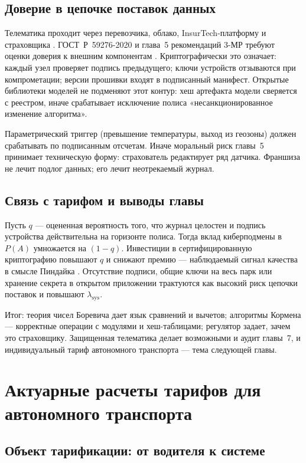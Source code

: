 \documentclass[a4paper,14pt]{extarticle}
\begin{document}
\subsection{Доверие в цепочке поставок данных}

Телематика проходит через перевозчика, облако, InsurTech-платформу и страховщика \cite{insurtech}. ГОСТ~Р~59276-2020 и глава~5 рекомендаций 3-МР требуют оценки доверия к внешним компонентам \cite{cbr}. Криптографически это означает: каждый узел проверяет подпись предыдущего; ключи устройств отзываются при компрометации; версии прошивки входят в подписанный манифест. Открытые библиотеки моделей не подменяют этот контур: хеш артефакта модели сверяется с реестром, иначе срабатывает исключение полиса «несанкционированное изменение алгоритма».

Параметрический триггер (превышение температуры, выход из геозоны) должен срабатывать по подписанным отсчетам. Иначе моральный риск главы~5 принимает техническую форму: страхователь редактирует ряд датчика. Франшиза не лечит подлог данных; его лечит неотрекаемый журнал.

\subsection{Связь с тарифом и выводы главы}

Пусть $q$ --- оцененная вероятность того, что журнал целостен и подпись устройства действительна на горизонте полиса. Тогда вклад киберподмены в $P(A)$ умножается на $(1-q)$. Инвестиции в сертифицированную криптографию повышают $q$ и снижают премию --- наблюдаемый сигнал качества в смысле Пиндайка \cite{pindyck}. Отсутствие подписи, общие ключи на весь парк или хранение секрета в открытом приложении трактуются как высокий риск цепочки поставок \cite{cbr} и повышают $\lambda_{\mathrm{sys}}$.

Итог: теория чисел Боревича дает язык сравнений и вычетов; алгоритмы Кормена --- корректные операции с модулями и хеш-таблицами; регулятор задает, зачем это страховщику. Защищенная телематика делает возможными и аудит главы~7, и индивидуальный тариф автономного транспорта --- тема следующей главы.

\section{Актуарные расчеты тарифов для автономного транспорта}

\subsection{Объект тарификации: от водителя к системе}
\end{document}
